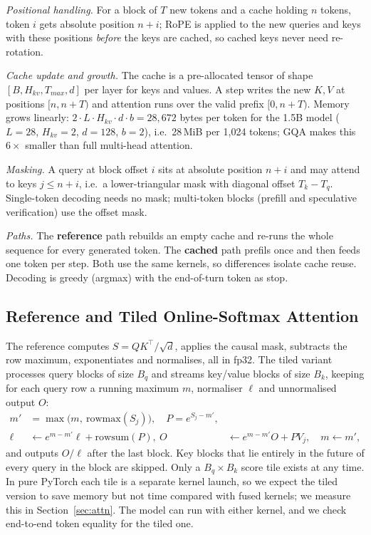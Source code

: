 \documentclass[conference]{IEEEtran}
\begin{document}
\emph{Positional handling.} For a block of $T$ new tokens and a cache holding $n$ tokens, token $i$ gets absolute position $n+i$; RoPE is applied to the new queries and keys with these positions \emph{before} the keys are cached, so cached keys never need re-rotation.

\emph{Cache update and growth.} The cache is a pre-allocated tensor of shape $[B,H_{kv},T_{max},d]$ per layer for keys and values. A step writes the new $K,V$ at positions $[n,n+T)$ and attention runs over the valid prefix $[0,n+T)$. Memory grows linearly: $2\cdot L\cdot H_{kv}\cdot d\cdot b = 28{,}672$ bytes per token for the 1.5B model ($L{=}28$, $H_{kv}{=}2$, $d{=}128$, $b{=}2$), i.e.\ 28\,MiB per 1,024 tokens; GQA makes this $6\times$ smaller than full multi-head attention.

\emph{Masking.} A query at block offset $i$ sits at absolute position $n+i$ and may attend to keys $j\le n+i$, i.e.\ a lower-triangular mask with diagonal offset $T_k-T_q$. Single-token decoding needs no mask; multi-token blocks (prefill and speculative verification) use the offset mask.

\emph{Paths.} The \textbf{reference} path rebuilds an empty cache and re-runs the whole sequence for every generated token. The \textbf{cached} path prefils once and then feeds one token per step. Both use the same kernels, so differences isolate cache reuse. Decoding is greedy (argmax) with the end-of-turn token as stop.

\subsection{Reference and Tiled Online-Softmax Attention}
The reference computes $S=QK^\top/\sqrt d$, applies the causal mask, subtracts the row maximum, exponentiates and normalises, all in fp32. The tiled variant processes query blocks of size $B_q$ and streams key/value blocks of size $B_k$, keeping for each query row a running maximum $m$, normaliser $\ell$ and unnormalised output $O$:
\begin{align}
m' &= \max\!\big(m,\ \mathrm{rowmax}(S_j)\big), \quad P = e^{S_j-m'},\\
\ell &\leftarrow e^{m-m'}\ell + \mathrm{rowsum}(P),\
O &\leftarrow e^{m-m'}O + P V_j,\quad m \leftarrow m',
\end{align}
and outputs $O/\ell$ after the last block. Key blocks that lie entirely in the future of every query in the block are skipped. Only a $B_q\times B_k$ score tile exists at any time. In pure PyTorch each tile is a separate kernel launch, so we expect the tiled version to save memory but not time compared with fused kernels; we measure this in Section~\ref{sec:attn}. The model can run with either kernel, and we check end-to-end token equality for the tiled one.
\end{document}

